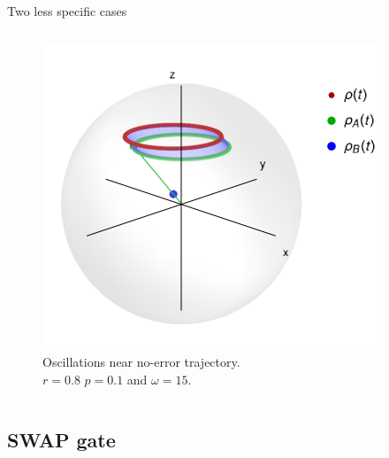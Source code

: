 \begin{frame}{Two less specific cases}
\begin{columns}
\begin{column}{0.5\textwidth}
\begin{figure}[h!]
                \includegraphics[width=0.6\columnwidth]{figures/U1xU2_H1=sz_H2=Id_z=0.8_p=0.7_sequence.png}%
                \caption{Oscillations near no-error trajectory.\\ $r=0.8$ $p=0.1$ and $\omega=15$. }
            \end{figure}
        \end{column}
    \end{columns}
\end{frame}


\subsection{SWAP gate}

